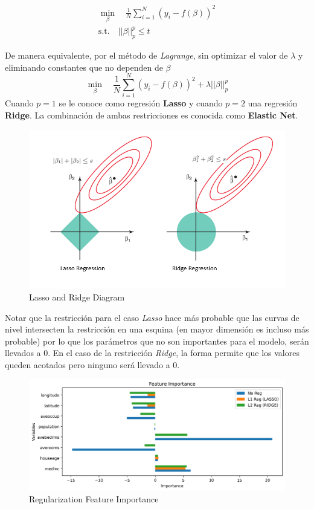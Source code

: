 \begin{equation*}
\begin{aligned}
\min_{\beta} \quad \frac{1}{N}\sum_{i=1}^N(y_i - f(\beta))^2 \\
\textrm{s.t.} \quad ||\beta||^{p}_{p} \leq t
\end{aligned}
\end{equation*}

De manera equivalente, por el método de \textit{Lagrange}, sin optimizar el valor de $\lambda$ y eliminando constantes que no dependen de $\beta$
$$\min_{\beta} \quad \frac{1}{N}\sum_{i=1}^N(y_i - f(\beta))^2 + \lambda ||\beta||^{p}_{p}$$
Cuando $p=1$ se le conoce como regresión \textbf{Lasso} y cuando $p=2$ una regresión \textbf{Ridge}. La combinación de ambas restricciones es conocida como \textbf{Elastic Net}. 

\begin{figure}[H]
    \center
    \includegraphics[scale=0.4]{notebooks/ML/img/lasso_and_ridge_diagram.png}
    \caption{Lasso and Ridge Diagram}
\end{figure}

Notar que la restricción para el caso \textit{Lasso} hace más probable que las curvas de nivel intersecten la restricción en una esquina (en mayor dimensión es incluso más probable) por lo que los parámetros que no son importantes para el modelo, serán llevados a 0. En el caso de la restricción \textit{Ridge}, la forma permite que los valores queden acotados pero ninguno será llevado a 0.

\begin{figure}[H]
    \center
    \includegraphics[scale=0.5]{notebooks/ML/img/regularization_feature_importance.png}
    \caption{Regularization Feature Importance}
\end{figure}


